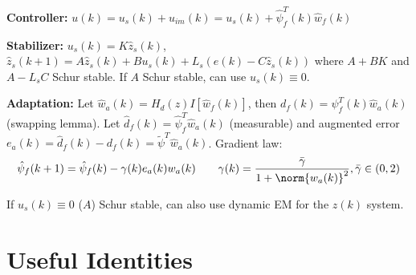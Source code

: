 \documentclass[twocolumn, 8pt]{extarticle}
\begin{document}
\textbf{Controller:} \(u(k) = u_s(k) + u_{im}(k) = u_s(k) + \hat\psi _f^T(k)\hat w_f(k)\)

\textbf{Stabilizer:} \(u_s(k) = K\hat z_s(k)\), \(\hat z_s(k + 1) = A\hat z_s(k) + Bu_s(k) + L_s(e(k) - C\hat z_s(k))\)
where \(A + BK\) and \(A - L_sC\) Schur stable. If \(A\) Schur stable, can use \(u_s(k) \equiv 0\).

\textbf{Adaptation:} Let \(\hat w_a(k) = H_d(z)I\left[\hat w_f(k)\right]\), then \(d_f(k) = \psi _f^T(k)\hat w_a(k)\)
(swapping lemma). Let \(\hat d_f(k) = \hat\psi _f^T\hat w_a(k)\) (measurable) and augmented error
\(e_a(k) = \hat d_f(k) - d_f(k) = \tilde\psi^T\hat w_a(k)\). Gradient law:
\[\hat\psi _f(k + 1) = \hat \psi _f(k) - \gamma(k)e_a(k)w_a(k) \qquad \gamma(k) = \frac{\bar\gamma}{1 + \norm{w_a(k)}^2}, \bar\gamma \in (0, 2)\]

If \(u_s(k) \equiv 0\) (\(A\)) Schur stable, can also use dynamic EM for the \(z(k)\) system.

\section{Useful Identities} %
\end{document}
